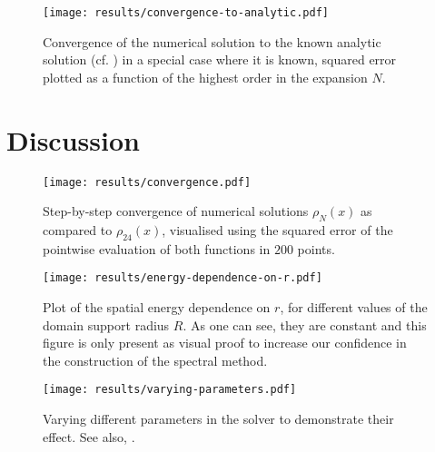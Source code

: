 \begin{figure}[H]
  \centering
  \label{fig:convergence-to-analytic}
  \texttt{[image: results/convergence-to-analytic.pdf]}
  \caption[Convergence to analytic solution]{Convergence of the numerical solution to the known analytic solution (cf. ) in a special case where it is known, squared error plotted as a function of the highest order in the expansion $N$.}
\end{figure}

\section{Discussion}
\begin{figure}[H]
  \centering
  \label{fig:convergence}
  \texttt{[image: results/convergence.pdf]}
  \caption[Step-by-step convergence of solutions compared to order 24]{Step-by-step convergence of numerical solutions $\rho_N(x)$ as compared to $\rho_{24}(x)$, visualised using the squared error of the pointwise evaluation of both functions in $200$ points.}
\end{figure}

\begin{figure}[H]
  \centering
  \label{fig:spatial-energy-dependence}
  \texttt{[image: results/energy-dependence-on-r.pdf]}
  \caption[Spatial energy dependence on $r$]{Plot of the spatial energy dependence on $r$, for different values of the domain support radius $R$. As one can see, they are constant and this figure is only present as visual proof to increase our confidence in the construction of the spectral method.}
\end{figure}

\begin{figure}[H]
  \centering
  \label{fig:varying-parameters}
  \texttt{[image: results/varying-parameters.pdf]}
  \caption[Varying parameters in the solver]{
    Varying different parameters in the solver to demonstrate their effect.
    See also, .
  }
\end{figure}
